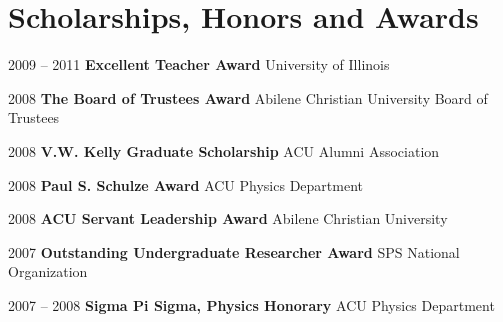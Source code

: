 \section{\textbf{Scholarships, Honors and Awards}}

\cventry
{2009 -- 2011}
{\textbf{Excellent Teacher Award}}
{}
{University of Illinois}{}{}

\cventry
{2008}
{\textbf{The Board of Trustees Award}}
{}
{Abilene Christian University Board of Trustees}{}{}

\cventry
{2008}
{\textbf{V.W. Kelly Graduate Scholarship}}
{}
{ACU Alumni Association}{}{}

\cventry 
{2008}
{\textbf{Paul S. Schulze Award}}
{}
{ACU Physics Department}{}{}

\cventry
{2008}
{\textbf{ACU Servant Leadership Award}
}
{}
{Abilene Christian University}{}{}

\cventry
{2007}
{\textbf{Outstanding Undergraduate Researcher Award}
}
{}
{SPS National Organization}{}{}

\cventry
{2007 -- 2008}
{\textbf{Sigma Pi Sigma, Physics Honorary}}
{}
{ACU Physics Department}{}{}
